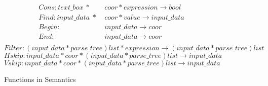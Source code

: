 \begin{figure*}[th]
\centering
\small
\begin{align*}
  Cons:text\_box~*&~coor*expression \rightarrow bool \\
  Find:input\_data~*&~coor*value \rightarrow input\_data \\
  Begin:&~input\_data \rightarrow coor \\
  End:&~input\_data \rightarrow coor \\
\end{align*}
\vspace{-10 mm}
\[
  Filter:(input\_data*parse\_tree)list*expression \rightarrow (input\_data*parse\_tree)list 
\]
\[
  Hskip:input\_data*coor*(input\_data*parse\_tree)list \rightarrow input\_data 
\]
\[
  Vskip:input\_data*coor*(input\_data*parse\_tree)list \rightarrow input\_data 
\]
\caption{Functions in Semantics}\label{fig:funseman}
\end{figure*}

